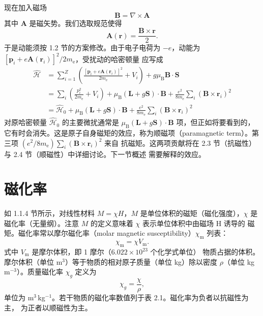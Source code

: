 现在加入磁场
\begin{equation*}
\mathbf{B} = \nabla\times\mathbf{A}\tag{2.4}
\end{equation*}
其中 $\mathbf{A}$ 是磁矢势。我们选取规范使得
\begin{equation*}
\mathbf{A}(\mathbf{r}) = \frac{\mathbf{B}\times\mathbf{r}}{2}.\tag{2.5}
\end{equation*}
于是动能须按 1.2 节的方案修改。由于电子电荷为 $-e$，动能为
$[\mathbf{p}_i+e\mathbf{A}(\mathbf{r}_i)]^{2}/2m_{\mathrm{e}}$，受扰动的哈密顿量
应写成
\begin{align*}
\hat{\mathcal{H}} &= \sum_{i=1}^{Z}\left(\frac{[\mathbf{p}_i+e\mathbf{A}(\mathbf{r}_i)]^{2}}{2m_{\mathrm{e}}} + V_i\right) + g\mu_{\mathrm{B}}\mathbf{B}\cdot\mathbf{S}\tag{2.6}\\
&= \sum_i\left(\frac{p_i^{2}}{2m_{\mathrm{e}}} + V_i\right) + \mu_{\mathrm{B}}(\mathbf{L}+g\mathbf{S})\cdot\mathbf{B} + \frac{e^{2}}{8m_{\mathrm{e}}}\sum_i(\mathbf{B}\times\mathbf{r}_i)^{2}\tag{2.7}\\
&= \hat{\mathcal{H}}_0 + \mu_{\mathrm{B}}(\mathbf{L}+g\mathbf{S})\cdot\mathbf{B} + \frac{e^{2}}{8m_{\mathrm{e}}}\sum_i(\mathbf{B}\times\mathbf{r}_i)^{2}\tag{2.8}
\end{align*}
对原哈密顿量 $\hat{\mathcal{H}}_0$ 的主要微扰通常是 $\mu_{\mathrm{B}}(\mathbf{L}+g\mathbf{S})\cdot\mathbf{B}$
项，但正如将要看到的，它有时会消失。这是原子自身磁矩的效应，称为顺磁项（paramagnetic
term）。第三项 $(e^{2}/8m_{\mathrm{e}})\sum_i(\mathbf{B}\times\mathbf{r}_i)^{2}$ 来自
抗磁矩。这两项贡献将在 2.3 节（抗磁性）与 2.4 节（顺磁性）中详细讨论。下一节概述
需要解释的效应。

\section{磁化率}

如 1.1.4 节所示，对线性材料 $M=\chi H$，$M$ 是单位体积的磁矩（磁化强度），$\chi$
是磁化率（无量纲）。注意 $M$ 的定义意味着 $\chi$ 表示单位体积中由磁场 H 诱导的
磁矩。磁化率常以摩尔磁化率（molar magnetic susceptibility）$\chi_{\mathrm{m}}$ 列表：
\begin{equation*}
\chi_{\mathrm{m}} = \chi V_{\mathrm{m}}.\tag{2.9}
\end{equation*}
式中 $V_{\mathrm{m}}$ 是摩尔体积，即 1 摩尔（$6.022\times10^{23}$ 个化学式单位）
物质占据的体积。摩尔体积（单位 m$^3$）等于物质的相对原子质量（单位 kg）除以密度
$\rho$（单位 kg\,m$^{-3}$）。质量磁化率 $\chi_g$ 定义为
\begin{equation*}
\chi_g = \frac{\chi}{\rho},\tag{2.10}
\end{equation*}
单位为 m$^3$\,kg$^{-1}$。若干物质的磁化率数值列于表 2.1。磁化率为负者以抗磁性为主，
为正者以顺磁性为主。

